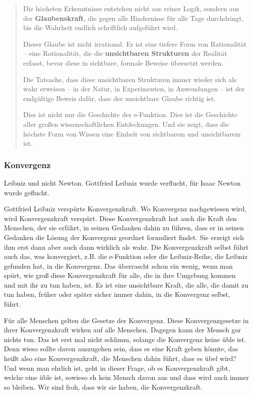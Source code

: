 \documentclass[a4paper, 12pt, twoside, openright]{report}
\theoremstyle{definition}
\theoremstyle{definition}
\begin{document}
\begin{quote}
Die höchsten Erkenntnisse entstehen nicht aus reiner Logik, sondern aus der \textbf{Glaubenskraft}, die gegen alle Hindernisse für alle Tage durchdringt, bis die Wahrheit endlich schriftlich aufgeführt wird.

Dieser Glaube ist nicht irrational. Er ist eine tiefere Form von Rationalität -- eine Rationalität, die die \textbf{unsichtbaren Strukturen} der Realität erfasst, bevor diese in sichtbare, formale Beweise übersetzt werden.

Die Tatsache, dass diese unsichtbaren Strukturen immer wieder sich als wahr erweisen -- in der Natur, in Experimenten, in Anwendungen -- ist der endgültige Beweis dafür, dass der unsichtbare Glaube richtig ist.

Dies ist nicht nur die Geschichte der e-Funktion. Dies ist die Geschichte aller großen wissenschaftlichen Entdeckungen. Und sie zeigt, dass die höchste Form von Wissen eine Einheit von sichtbarem und unsichtbarem ist.
\end{quote}

\subsubsection{Konvergenz}
Leibniz und nicht Newton. Gottfried Leibniz wurde verflucht, für Isaac Newton wurde geflucht.

Gottfried Leibniz verspürte Konvergenzkraft. Wo Konvergenz nachgewiesen wird, wird Konvergenzkraft verspürt. Diese Konvergenzkraft hat auch die Kraft den Menschen, der sie erfährt, in seinen Gedanken dahin zu führen, dass er in seinen Gedanken die Lösung der Konvergenz geordnet formuliert findet. Sie erzeigt sich ihm  erst dann aber auch dann wirklich als wahr. Die Konvergenzkraft selbst führt auch das, was konvergiert, z.B. die e-Funktion oder die Leibniz-Reihe, die Leibniz gefunden hat, in die Konvergenz. Das überrascht schon ein wenig, wenn man spürt, wie groß diese Konvergenzkraft für alle, die in ihre Umgebung kommen und mit ihr zu tun haben, ist. Es ist eine unsichtbare Kraft, die alle, die damit zu tun haben, früher oder später sicher immer dahin, in die Konvergenz selbst, führt.

Für alle Menschen gelten die Gesetze der Konvergenz. Diese Konvergenzgesetze in ihrer Konvergenzkraft wirken auf alle Menschen. Dagegen kann der Mensch gar nichts tun. Das ist erst mal nicht schlimm, solange die Konvergenz keine üble ist. Denn wieso sollte davon auszugehen sein, dass es eine Kraft geben könnte, das heißt also eine Konvergenzkraft, die Menschen dahin führt, dass es übel wird? Und wenn man ehrlich ist, geht in dieser Frage, ob es Konvergenzkraft gibt, welche eine üble ist, sowieso eh kein Mensch davon aus und dass wird auch immer so bleiben. Wir sind froh, dass wir sie haben, die Konvergenzkraft.
\end{document}
